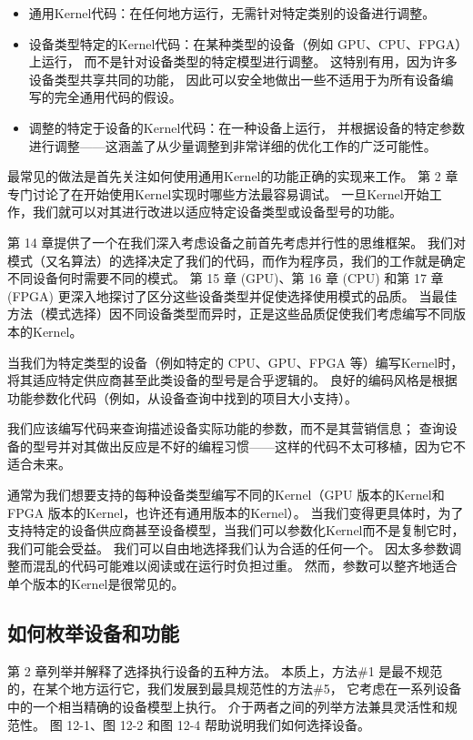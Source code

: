 \begin{itemize}
	\item 通用Kernel代码：在任何地方运行，无需针对特定类别的设备进行调整。

	\item 设备类型特定的Kernel代码：在某种类型的设备（例如 GPU、CPU、FPGA）上运行，
	而不是针对设备类型的特定模型进行调整。 这特别有用，因为许多设备类型共享共同的功能，
	因此可以安全地做出一些不适用于为所有设备编写的完全通用代码的假设。

	\item 调整的特定于设备的Kernel代码：在一种设备上运行，
	并根据设备的特定参数进行调整——这涵盖了从少量调整到非常详细的优化工作的广泛可能性。
\end{itemize}

最常见的做法是首先关注如何使用通用Kernel的功能正确的实现来工作。 
第 2 章专门讨论了在开始使用Kernel实现时哪些方法最容易调试。 
一旦Kernel开始工作，我们就可以对其进行改进以适应特定设备类型或设备型号的功能。

第 14 章提供了一个在我们深入考虑设备之前首先考虑并行性的思维框架。 
我们对模式（又名算法）的选择决定了我们的代码，而作为程序员，我们的工作就是确定不同设备何时需要不同的模式。 
第 15 章 (GPU)、第 16 章 (CPU) 和第 17 章 (FPGA) 更深入地探讨了区分这些设备类型并促使选择使用模式的品质。 
当最佳方法（模式选择）因不同设备类型而异时，正是这些品质促使我们考虑编写不同版本的Kernel。

当我们为特定类型的设备（例如特定的 CPU、GPU、FPGA 等）编写Kernel时，
将其适应特定供应商甚至此类设备的型号是合乎逻辑的。 
良好的编码风格是根据功能参数化代码（例如，从设备查询中找到的项目大小支持）。

我们应该编写代码来查询描述设备实际功能的参数，而不是其营销信息； 
查询设备的型号并对其做出反应是不好的编程习惯——这样的代码不太可移植，因为它不适合未来。

通常为我们想要支持的每种设备类型编写不同的Kernel（GPU 版本的Kernel和 FPGA 版本的Kernel，也许还有通用版本的Kernel）。 
当我们变得更具体时，为了支持特定的设备供应商甚至设备模型，当我们可以参数化Kernel而不是复制它时，我们可能会受益。 
我们可以自由地选择我们认为合适的任何一个。 因太多参数调整而混乱的代码可能难以阅读或在运行时负担过重。 
然而，参数可以整齐地适合单个版本的Kernel是很常见的。

\subsection{如何枚举设备和功能}
第 2 章列举并解释了选择执行设备的五种方法。 
本质上，方法\#1 是最不规范的，在某个地方运行它，我们发展到最具规范性的方法\#5，
它考虑在一系列设备中的一个相当精确的设备模型上执行。 介于两者之间的列举方法兼具灵活性和规范性。 
图 12-1、图 12-2 和图 12-4 帮助说明我们如何选择设备。

